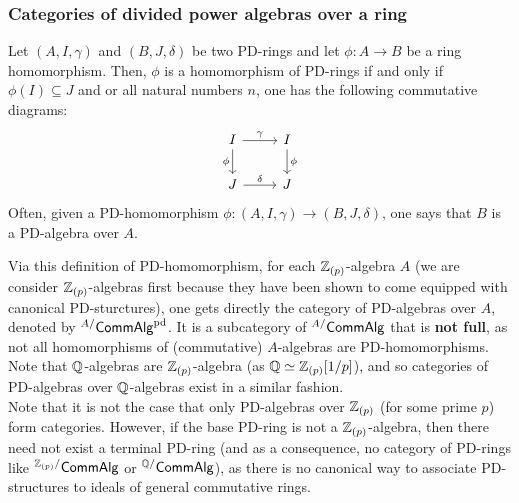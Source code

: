             \subsubsection{Categories of divided power algebras over a ring}
                \begin{definition}[PD-homomorphisms] \label{def: PD_homomorphisms}
                    Let $(A, I , \gamma)$ and $(B, J, \delta)$ be two PD-rings and let $\phi: A \to B$ be a ring homomorphism. Then, $\phi$ is a homomorphism of PD-rings if and only if $\phi(I) \subseteq J$ and or all natural numbers $n$, one has the following commutative diagrams:
                        $$
                            \begin{tikzcd}
                            	{I} & {I} \\
                            	{J} & {J}
                            	\arrow["{\phi}"', from=1-1, to=2-1]
                            	\arrow["{\phi}", from=1-2, to=2-2]
                            	\arrow["{\delta}", from=2-1, to=2-2]
                            	\arrow["{\gamma}", from=1-1, to=1-2]
                            \end{tikzcd}
                        $$
                    Often, given a PD-homomorphism $\phi: (A, I, \gamma) \to (B, J, \delta)$, one says that $B$ is a PD-algebra over $A$. 
                \end{definition}
                \begin{remark}
                    Via this definition of PD-homomorphism, for each $\mathbb{Z}_{(p)}$-algebra $A$ (we are consider $\mathbb{Z}_{(p)}$-algebras first because they have been shown to come equipped with canonical PD-sturctures), one gets directly the category of PD-algebras over $A$, denoted by ${}^{A/}\mathsf{Comm}\mathsf{Alg}^{\mathrm{pd}}$. It is a subcategory of ${}^{A/}\mathsf{Comm}\mathsf{Alg}$ that is \textbf{not full}, as not all homomorphisms of (commutative) $A$-algebras are PD-homomorphisms. Note that $\mathbb{Q}$-algebras are $\mathbb{Z}_{(p)}$-algebra (as $\mathbb{Q} \simeq \mathbb{Z}_{(p)}[1/p]$), and so categories of PD-algebras over $\mathbb{Q}$-algebras exist in a similar fashion.
                    \\
                    Note that it is not the case that only PD-algebras over $\mathbb{Z}_{(p)}$ (for some prime $p$) form categories. However, if the base PD-ring is not a $\mathbb{Z}_{(p)}$-algebra, then there need not exist a terminal PD-ring (and as a consequence, no  category of PD-rings like ${}^{\mathbb{Z}_{(p)}/}\mathsf{Comm}\mathsf{Alg}$ or ${}^{\mathbb{Q}/}\mathsf{Comm}\mathsf{Alg}$), as there is no canonical way to associate PD-structures to ideals of general commutative rings.  
                \end{remark}
                
